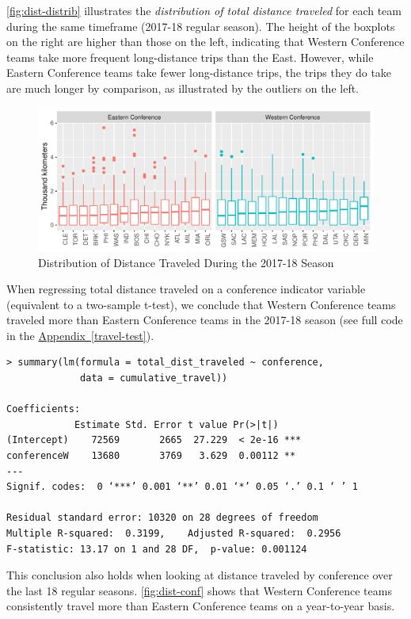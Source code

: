 \documentclass[
    12pt,
    a4paper,
    titlepage,  %
    abstract,  %
    headings=standardclasses,  %
    bibliography=totocnumbered  %
]{scrartcl}
\begin{document}
\autoref{fig:dist-distrib} illustrates the \emph{distribution of total distance traveled} for each team during the same timeframe (2017-18 regular season). The height of the boxplots on the right are higher than those on the left, indicating that Western Conference teams take more frequent long-distance trips than the East. However, while Eastern Conference teams take fewer long-distance trips, the trips they do take are much longer by comparison, as illustrated by the outliers on the left.

\begin{figure}[ht]
    \centering
    \includegraphics[width=\linewidth]{dist-distrib}
    \caption{Distribution of Distance Traveled During the 2017-18 Season}
    \label{fig:dist-distrib}
\end{figure}

When regressing total distance traveled on a conference indicator variable (equivalent to a two-sample t-test), we conclude that Western Conference teams traveled more than Eastern Conference teams in the 2017-18 season (see full code in the \hyperref[travel-test]{Appendix~\ref*{travel-test}}).

\begin{Verbatim}
> summary(lm(formula = total_dist_traveled ~ conference,
             data = cumulative_travel))

Coefficients:
            Estimate Std. Error t value Pr(>|t|)    
(Intercept)    72569       2665  27.229  < 2e-16 ***
conferenceW    13680       3769   3.629  0.00112 ** 
---
Signif. codes:  0 ‘***’ 0.001 ‘**’ 0.01 ‘*’ 0.05 ‘.’ 0.1 ‘ ’ 1

Residual standard error: 10320 on 28 degrees of freedom
Multiple R-squared:  0.3199,    Adjusted R-squared:  0.2956 
F-statistic: 13.17 on 1 and 28 DF,  p-value: 0.001124
\end{Verbatim}

This conclusion also holds when looking at distance traveled by conference over the last 18 regular seasons. \autoref{fig:dist-conf} shows that Western Conference teams consistently travel more than Eastern Conference teams on a year-to-year basis.
\end{document}
